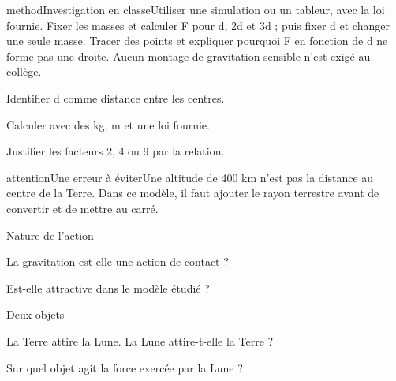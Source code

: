 \label{activite-10}
\begin{pcEncadre}{method}{Investigation en classe}Utiliser une simulation ou un tableur, avec la loi fournie. Fixer les masses et calculer F pour d, 2d et 3d ; puis fixer d et changer une seule masse. Tracer des points et expliquer pourquoi F en fonction de d ne forme pas une droite. Aucun montage de gravitation sensible n’est exigé au collège.\end{pcEncadre}
\begin{questions}
\item Identifier d comme distance entre les centres.
\item Calculer avec des kg, m et une loi fournie.
\item Justifier les facteurs 2, 4 ou 9 par la relation.
\end{questions}
\begin{pcEncadre}{attention}{Une erreur à éviter}Une altitude de 400 km n’est pas la distance au centre de la Terre. Dans ce modèle, il faut ajouter le rayon terrestre avant de convertir et de mettre au carré.\end{pcEncadre}
\pcGrille
\clearpage{}
\par\noindent\begin{minipage}{\linewidth}
\begin{exercice}[1]{Nature de l’action}
\begin{questions}
\item La gravitation est-elle une action de contact ?
\item Est-elle attractive dans le modèle étudié ?
\end{questions}
\end{exercice}
\end{minipage}
\par\noindent\begin{minipage}{\linewidth}
\begin{exercice}[1]{Deux objets}
\begin{questions}
\item La Terre attire la Lune. La Lune attire-t-elle la Terre ?
\item Sur quel objet agit la force exercée par la Lune ?
\end{questions}
\end{exercice}
\end{minipage}
